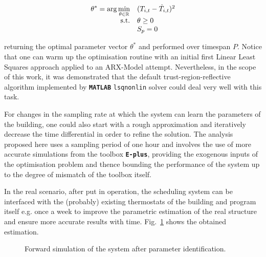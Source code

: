  \begin{equation}
 \begin{array}{rlclcl}
 \displaystyle \theta^*=\arg \min_{\theta\in\mathbb{R}} & \multicolumn{3}{l}{(T_{i,t}-\hat{T}_{i,t})^2} \\
 \textrm{s.t.} & \theta \geq 0 \\
 & S_p = 0\\
 \end{array}
 \label{eq:opt_k_cluster}
 \end{equation}

returning the optimal parameter vector $\theta^*$ and performed over timespan $P$. Notice that one can warm up the optimisation routine with an initial first Linear Least Squares approach applied to an ARX-Model attempt. Nevertheless, in the scope of this work, it was demonstrated that the default trust-region-reflective algorithm implemented by \textbf{\texttt{MATLAB}} \texttt{lsqnonlin} solver could deal very well with this task.

For changes in the sampling rate at which the system can learn the parameters of the building, one could also start with a rough approximation and iteratively decrease the time differential in order to refine the solution. The analysis proposed here uses a sampling period of one hour and involves the use of more accurate simulations from the toolbox \textbf{\texttt{E-plus}}, providing the exogenous inputs of the optimisation problem and thence bounding the performance of the system up to the degree of mismatch of the toolbox itself.

In the real scenario, after put in operation, the scheduling system can be interfaced with the (probably) existing thermostats of the building and program itself e.g. once a week to improve the parametric estimation of the real structure and ensure more accurate results with time. Fig.~\ref{fig:sys_id} shows the obtained estimation.

   \begin{figure}[thpb]
   	\centering
   		\caption{Forward simulation of the system after parameter identification.}
   		\label{fig:sys_id}
   	\end{figure}

